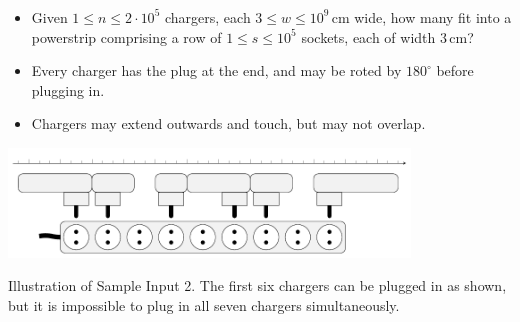 \begin{frame}
  \frametitle{\problemtitle}

  \begin{itemize}
  \item Given $1\leq n\leq 2\cdot 10^5$ chargers, each $3\leq w\leq
    10^9\,\textrm{cm}$ wide, how many fit into a powerstrip
    comprising a row of $1\leq s\leq 10^5$ sockets, each of width $3\,\textrm{cm}$?
  \item Every charger has the plug at the end, and may be roted by $180^\circ$ before plugging in.
  \item Chargers may extend outwards and touch, but may not overlap.
  \end{itemize}

  \centering
  \includegraphics[width=0.8\textwidth]{powerstrip.pdf}

  \small
  Illustration of Sample Input 2.
  The first six chargers can be plugged in as shown, but it is impossible
  to plug in all seven chargers simultaneously.
\end{frame}
